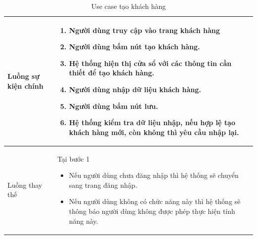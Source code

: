 \documentclass[12pt,a4paper]{article}
\begin{document}
\begin{table}[H]
\begin{tabular}{|p{3.5cm}|p{11.5cm}|c|}
            Luồng sự kiện chính & \vspace{-.8cm}\begin{enumerate}
                                                    \item Người dùng truy cập vào trang khách hàng
                                                    \item  Người dùng bấm nút tạo khách hàng.
                                                    \item  Hệ thống hiện thị cửa sổ với các thông tin cần thiết để tạo khách hàng.
                                                    \item  Người dùng nhập dữ liệu khách hàng.
                                                    \item Người dùng bấm nút lưu.
                                                    \item Hệ thống kiểm tra dữ liệu nhập, nếu hợp lệ tạo khách hàng mới, còn không thì yêu cầu nhập lại.
            \end{enumerate}
            \\
            \hline
            Luồng thay thế & Tại bước 1\newline
            \vspace{-.8cm}\begin{itemize}
                              \item Nếu người dùng chưa đăng nhập thì hệ thống sẽ chuyển sang trang đăng nhập.
                              \item  Nếu người dùng không có chức năng này thì hệ thống sẽ thông báo người dùng không được phép thực hiện tính năng này.
            \end{itemize}
            \\
            \hline
        \end{tabular}
        \caption{Use case tạo khách hàng}
    \end{table}


\end{document}
